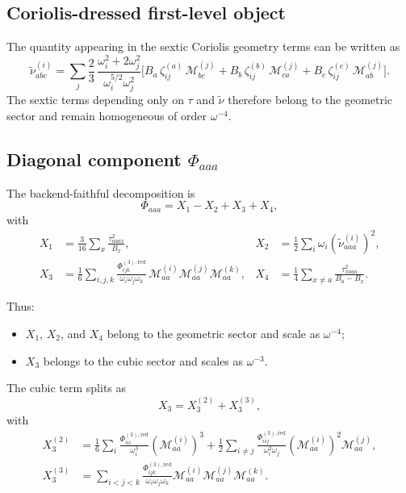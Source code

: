 \subsection*{Coriolis-dressed first-level object}

The quantity appearing in the sextic Coriolis geometry terms can be written as
\begin{equation}
\widetilde{\nu}^{(i)}_{abc}
=
\sum_j
\frac{2}{3}\,
\frac{\omega_i^2+2\omega_j^2}{\omega_i^{5/2}\omega_j^2}
\Big[
B_a\,\zeta^{(a)}_{ij}\,\mathcal{M}^{(j)}_{bc}
+
B_b\,\zeta^{(b)}_{ij}\,\mathcal{M}^{(j)}_{ca}
+
B_c\,\zeta^{(c)}_{ij}\,\mathcal{M}^{(j)}_{ab}
\Big].
\label{eq:sextic_working_nu_mu1}
\end{equation}
The sextic terms depending only on $\tau$ and $\widetilde{\nu}$ therefore
belong to the geometric sector and remain homogeneous of order $\omega^{-4}$.

\subsection*{Diagonal component $\Phi_{aaa}$}

The backend-faithful decomposition is
\begin{equation}
\Phi_{aaa}=X_1-X_2+X_3+X_4,
\end{equation}
with
\begin{align}
X_1 &= \frac{3}{16}\sum_x\frac{\tau_{aaax}^2}{B_x},
&
X_2 &= \frac{1}{2}\sum_i \omega_i\left(\widetilde{\nu}^{(i)}_{aaa}\right)^2,
\\
X_3 &= \frac{1}{6}\sum_{i,j,k}
\frac{\Phi^{(3),\mathrm{red}}_{ijk}}{\omega_i\omega_j\omega_k}\,
\mathcal{M}^{(i)}_{aa}\mathcal{M}^{(j)}_{aa}\mathcal{M}^{(k)}_{aa},
&
X_4 &= \frac{1}{4}\sum_{x\neq a}
\frac{\tau_{xaaa}^2}{B_a-B_x}.
\end{align}

Thus:
\begin{itemize}
\item $X_1$, $X_2$, and $X_4$ belong to the geometric sector and scale as
$\omega^{-4}$;
\item $X_3$ belongs to the cubic sector and scales as $\omega^{-3}$.
\end{itemize}

The cubic term splits as
\begin{equation}
X_3 = X_3^{(2)} + X_3^{(3)},
\end{equation}
with
\begin{align}
X_3^{(2)}
&=
\frac{1}{6}\sum_i
\frac{\Phi^{(3),\mathrm{red}}_{iii}}{\omega_i^3}
\left(\mathcal{M}^{(i)}_{aa}\right)^3
+\frac{1}{2}\sum_{i\neq j}
\frac{\Phi^{(3),\mathrm{red}}_{iij}}{\omega_i^2\omega_j}
\left(\mathcal{M}^{(i)}_{aa}\right)^2\mathcal{M}^{(j)}_{aa},
\\
X_3^{(3)}
&=
\sum_{i<j<k}
\frac{\Phi^{(3),\mathrm{red}}_{ijk}}{\omega_i\omega_j\omega_k}
\mathcal{M}^{(i)}_{aa}\mathcal{M}^{(j)}_{aa}\mathcal{M}^{(k)}_{aa}.
\end{align}

